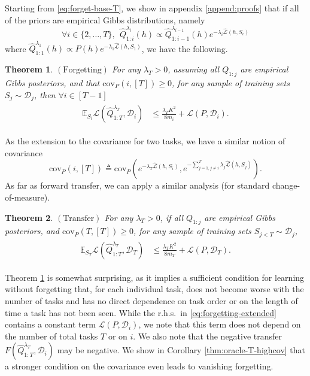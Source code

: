 \documentclass{article}
\theoremstyle{plain}
\newtheorem{theorem}{Theorem}[section]
\theoremstyle{definition}
\theoremstyle{remark}
\begin{document}
Starting from \eqref{eq:forget-base-T}, we show in appendix \ref{append:proofs} that if all of the priors are empirical Gibbs distributions, namely
$$\forall i\in\{2,\ldots,T\}, ~~\hat{Q}^{\lambda_i}_{1:i}(h)\propto \hat{Q}^{\lambda_{i-1}}_{1:i-1}(h)e^{-\lambda_i\hat{\mathcal{L}}(h,S_i)}$$ 
where $\hat{Q}^{\lambda_1}_{1:1}(h)\propto P(h)e^{-\lambda_1\hat{\mathcal{L}}(h,S_1)}$, we have the following.

\begin{theorem} $\mathrm{(Forgetting)}$ \label{thm:forgetting-extended}
For any $\lambda_T>0$, assuming all $Q_{1:j}$ are empirical Gibbs posteriors, and that
 $\mathrm{cov}_{P}(i, [T])\geq 0$,
for any sample of training sets $S_{j}\sim \mathcal{D}_j$, then $\forall i\in[T-1]$
%
\begin{align} \label{eq:forgetting-extended}
\begin{split}
\mathbb{E}_{S_i}\mathcal{L}(\hat{Q}^{\lambda_T}_{1:T}, \mathcal{D}_i) &\leq \frac{\lambda_T K^2}{8m_i}+\mathcal{L}(P,\mathcal{D}_i).
\end{split}
\end{align}
\end{theorem}
%
As the extension to the covariance for two tasks, we have a similar notion of covariance 
$$\mathrm{cov}_{P}(i, [T])\triangleq\mathrm{cov}_{P}(e^{-\lambda_T\hat{\mathcal{L}}(h,S_i)}, e^{-\sum_{j=1,j\neq i}^{T}\lambda_j\hat{\mathcal{L}}(h,S_j)}).$$
%
As far as forward transfer, we can apply a similar analysis (for standard change-of-measure). 
%
\begin{theorem} $\mathrm{(Transfer)}$ 
For any $\lambda_T>0$, if all $Q_{1:j}$ are empirical Gibbs posteriors,
and $\mathrm{cov}_{P}(T, [T])\geq 0$,
for any sample of training sets $S_{j< T}\sim \mathcal{D}_j$,
%
\begin{align} 
\begin{split}
\mathbb{E}_{S_T}\mathcal{L}(\hat{Q}^{\lambda_T}_{1:T}, \mathcal{D}_T) &\leq \frac{\lambda_T K^2}{8m_T}+\mathcal{L}(P,\mathcal{D}_T) .
\end{split}
\end{align}
\end{theorem}
%
Theorem \ref{thm:forgetting-extended} is somewhat surprising, as it implies a sufficient condition for learning without forgetting that, for each individual task, does not become worse with the number of tasks and has no direct dependence on task order or on the length of time a task has not been seen. While the r.h.s.~in \eqref{eq:forgetting-extended} contains a constant term $\mathcal{L}(P,\mathcal{D}_i)$, we note that this term does not depend on the number of total tasks $T$ or on $i$. We also note that the negative transfer $F(\hat{Q}^{\lambda_T}_{1:T}, \mathcal{D}_i)$ may be negative. We show in Corollary \ref{thm:oracle-T-highcov} that a stronger condition on the covariance even leads to vanishing forgetting.
\end{document}
